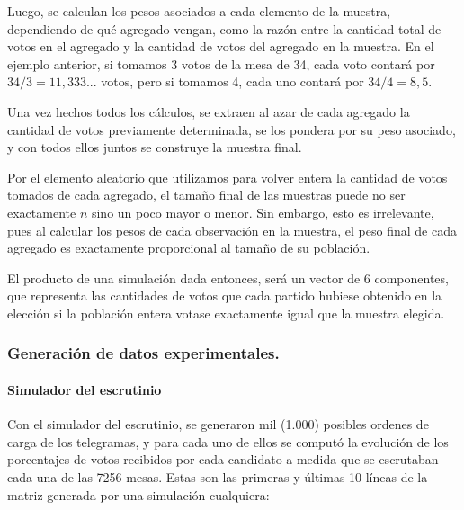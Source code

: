 \documentclass[12pt, a4paper]{article}
\begin{document}
Luego, se calculan los pesos asociados a cada elemento de la muestra, dependiendo de qu\'e agregado vengan, como la raz\'on entre la cantidad total de votos en el agregado y la cantidad de votos del agregado en la muestra. En el ejemplo anterior, si tomamos 3 votos de la mesa de 34, cada voto contar\'a por $34/3 = 11,333...$ votos, pero si tomamos 4, cada uno contar\'a por $34/4 = 8,5$.

Una vez hechos todos los c\'alculos, se extraen al azar de cada agregado la cantidad de votos previamente determinada, se los pondera por su peso asociado, y con todos ellos juntos se construye la muestra final.

Por el elemento aleatorio que utilizamos para volver entera la cantidad de votos tomados de cada agregado, el tama\~no final de las muestras puede no ser exactamente $n$ sino un poco mayor o menor. Sin embargo, esto es irrelevante, pues al calcular los pesos de cada observaci\'on en la muestra, el peso final de cada agregado es exactamente proporcional al tama\~no de su poblaci\'on.

El producto de una simulaci\'on dada entonces, ser\'a un vector de 6 componentes, que representa las cantidades de votos que cada partido hubiese obtenido en la elecci\'on si la poblaci\'on entera votase exactamente igual que la muestra elegida.

\subsubsection{Generaci\'on de datos experimentales.}

\paragraph{Simulador del escrutinio}

Con el simulador del escrutinio, se generaron mil (1.000) posibles ordenes de carga de los telegramas, y para cada uno de ellos se comput\'o la evoluci\'on de los porcentajes de votos recibidos por cada candidato a medida que se escrutaban cada una de las 7256 mesas. Estas son las primeras y \'ultimas 10 l\'ineas de la matriz generada por una simulaci\'on cualquiera:
\end{document}
